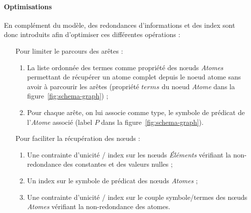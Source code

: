 \paragraph{Optimisations}
En complément du modèle, des redondances d'informations et des index sont donc introduits afin d'optimiser ces différentes opérations :
\begin{itemize}[wide=0pt]
    \item[Pour limiter le parcours des arêtes] :
        \begin{enumerate}
            \item La liste ordonnée des termes comme propriété des nœuds \textit{Atomes} permettant de récupérer un atome complet depuis le noeud atome sans avoir à parcourir les arêtes (propriété $terms$ du noeud \textit{Atome} dans la figure~\ref{fig:schema-graph}) ;
            \item Pour chaque arête, on lui associe comme type, le symbole de prédicat de l'\textit{Atome} associé (label $P$ dans la figure~\ref{fig:schema-graph}).
        \end{enumerate}
    \item[Pour faciliter la récupération des nœuds] :
        \begin{enumerate}
            \item Une contrainte d'unicité / index sur les nœuds \textit{Éléments} vérifiant la non-redondance des constantes et des valeurs nulles ;
            \item Un index sur le symbole de prédicat des nœuds \textit{Atomes} ;
            \item Une contrainte d'unicité / index sur le couple symbole/termes des nœuds \textit{Atomes} vérifiant la non-redondance des atomes.
        \end{enumerate}
\end{itemize}
